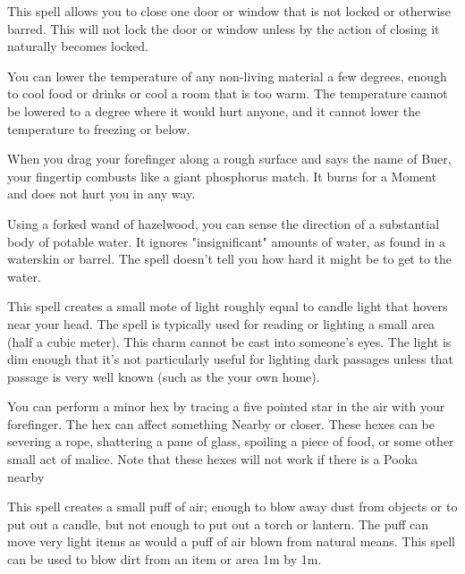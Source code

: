{This spell allows you to close one door or window that is not locked or otherwise barred. This will not lock the door or window unless by the action of closing it naturally becomes locked. 




You can lower the temperature of any non-living material a few degrees, enough to cool food or drinks or cool a room that is too warm.  The temperature cannot be lowered to a degree where it would hurt anyone, and it cannot lower the temperature to freezing or below.



When you drag your forefinger along a rough surface and says the name of Buer, your fingertip combusts like a giant phosphorus match. It burns for a Moment and does not hurt you in any way.


Using a forked wand of hazelwood, you can sense the direction of a substantial body of potable water.  It ignores "insignificant" amounts of water, as found in a waterskin or barrel.  The spell doesn’t tell you how hard it might be to get to the water.


This spell creates a small mote of light roughly equal to candle light that hovers near your head. The spell is typically used for reading or lighting a small area (half a cubic meter). This charm cannot be cast into someone's eyes. The light is dim enough that it's not particularly useful for lighting dark passages unless that passage is very well known (such as the your own home). 




You can perform a minor hex by tracing a five pointed star in the air with your forefinger. The hex can affect something Nearby or closer.  These hexes can be severing a rope, shattering a pane of glass, spoiling a piece of food, or some other small act of malice.  Note that these hexes will not work if there is a Pooka nearby


This spell creates a small puff of air; enough to blow away dust from objects or to put out a candle, but not enough to put out a torch or lantern. The puff can move very light items as would a puff of air blown from natural means. This spell can be used to blow dirt from an item or area 1m by 1m. 

}
